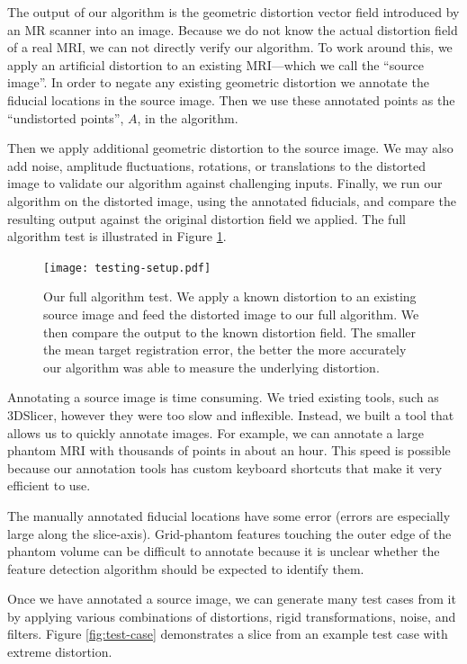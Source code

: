 \documentclass[12pt]{article}
\begin{document}
The output of our algorithm is the geometric distortion vector field introduced by an MR scanner into an image.  Because we do not know the actual distortion field of a real MRI, we can not directly verify our algorithm.  To work around this, we apply an artificial distortion to an existing MRI---which we call the ``source image''.  In order to negate any existing geometric distortion we annotate the fiducial locations in the source image.  Then we use these annotated points as the ``undistorted points'', $A$, in the algorithm.

Then we apply additional geometric distortion to the source image.  We may also add noise, amplitude fluctuations, rotations, or translations to the distorted image to validate our algorithm against challenging inputs.  Finally, we run our algorithm on the distorted image, using the annotated fiducials, and compare the resulting output against the original distortion field we applied.  The full algorithm test is illustrated in Figure \ref{fig:testing-setup}.

\begin{figure}
    \centering
    \texttt{[image: testing-setup.pdf]}
    \caption{Our full algorithm test.  We apply a known distortion to an existing source image and feed the distorted image to our full algorithm.  We then compare the output to the known distortion field.  The smaller the mean target registration error, the better the more accurately our algorithm was able to measure the underlying distortion.}
    \label{fig:testing-setup}
\end{figure}

Annotating a source image is time consuming.  We tried existing tools, such as 3DSlicer, however they were too slow and inflexible.  Instead, we built a tool that allows us to quickly annotate images.  For example, we can annotate a large phantom MRI with thousands of points in about an hour.  This speed is possible because our annotation tools has custom keyboard shortcuts that make it very efficient to use.

The manually annotated fiducial locations have some error (errors are especially large along the slice-axis).  Grid-phantom features touching the outer edge of the phantom volume can be difficult to annotate because it is unclear whether the feature detection algorithm should be expected to identify them.

Once we have annotated a source image, we can generate many test cases from it by applying various combinations of distortions, rigid transformations, noise, and filters.  Figure \ref{fig:test-case} demonstrates a slice from an example test case with extreme distortion.
\end{document}
